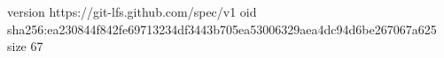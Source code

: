 version https://git-lfs.github.com/spec/v1
oid sha256:ea230844f842fe69713234df3443b705ea53006329aea4dc94d6be267067a625
size 67
